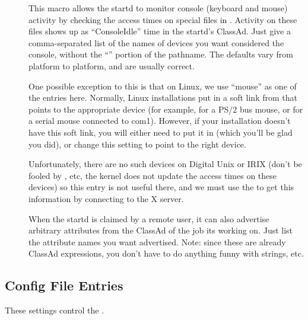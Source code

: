 \begin{description}
\item[] \label{param:ConsoleDevices} This
  macro allows the startd to monitor console (keyboard and mouse)
  activity by checking the access times on special files in
  .  Activity on these files shows up as ``ConsoleIdle''
  time in the startd's ClassAd.  Just give a comma-separated list of
  the names of devices you want considered the console, without the
  ``'' portion of the pathname.  The defaults vary from
  platform to platform, and are usually correct.  

  One possible exception to this is that on Linux, we use ``mouse'' as
  one of the entries here.  Normally, Linux installations put in a
  soft link from  that points to the appropriate
  device (for example,  for a PS/2 bus mouse, or
   for a serial mouse connected to com1).  However,
  if your installation doesn't have this soft link, you will either
  need to put it in (which you'll be glad you did), or change this
  setting to point to the right device. 
  
  Unfortunately, there are no such devices on Digital Unix or IRIX
  (don't be fooled by , etc, the kernel does not
  update the access times on these devices) so this entry is not
  useful there, and we must use the  to get this
  information by connecting to the X server.
  
\item[] \label{param:StartdJobExprs} When
  the startd is claimed by a remote user, it can also advertise
  arbitrary attributes from the ClassAd of the job its working on.
  Just list the attribute names you want advertised.  Note: since
  these are already ClassAd expressions, you don't have to do anything
  funny with strings, etc.

\end{description}

\subsection{ Config File Entries}
\label{sec:Schedd-Config-File-Entries}

These settings control the .

